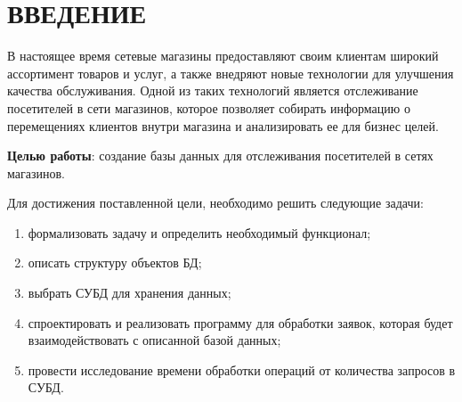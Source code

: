 \section*{\large ВВЕДЕНИЕ}


В настоящее время сетевые магазины предоставляют своим клиентам широкий ассортимент
товаров и услуг, а также внедряют новые технологии для улучшения качества обслуживания.
Одной из таких технологий является отслеживание посетителей в сети магазинов,
которое позволяет собирать информацию о перемещениях клиентов внутри магазина и анализировать
ее для бизнес целей.

\textbf{Целью работы}: создание базы данных для отслеживания посетителей в сетях магазинов.


Для достижения поставленной цели, необходимо решить следующие задачи:
\begin{enumerate}[label=\arabic*.]
	\item формализовать задачу и определить необходимый функционал;
	\item описать структуру объектов БД;
	\item выбрать СУБД для хранения данных;
	\item спроектировать и реализовать программу для обработки заявок, которая будет взаимодействовать с описанной базой данных; 
	\item провести исследование времени обработки операций от количества запросов в СУБД.
\end{enumerate}